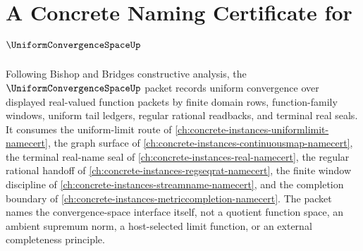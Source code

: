 \chapter{A Concrete Naming Certificate for $\UniformConvergenceSpaceUp$}
\label{ch:concrete-instances-uniform-convergence-space-namecert}

Following Bishop and Bridges constructive analysis, the $\UniformConvergenceSpaceUp$ packet records uniform convergence over displayed real-valued function packets by finite domain rows, function-family windows, uniform tail ledgers, regular rational readbacks, and terminal real seals. It consumes the uniform-limit route of \autoref{ch:concrete-instances-uniformlimit-namecert}, the graph surface of \autoref{ch:concrete-instances-continuousmap-namecert}, the terminal real-name seal of \autoref{ch:concrete-instances-real-namecert}, the regular rational handoff of \autoref{ch:concrete-instances-regseqrat-namecert}, the finite window discipline of \autoref{ch:concrete-instances-streamname-namecert}, and the completion boundary of \autoref{ch:concrete-instances-metriccompletion-namecert}. The packet names the convergence-space interface itself, not a quotient function space, an ambient supremum norm, a host-selected limit function, or an external completeness principle.

